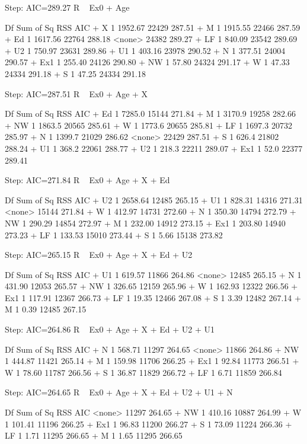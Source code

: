 \documentclass[a4paper]{article}
\begin{document}
\begin{itemize}
\begin{itemize}
\begin{itemize}
\begin{Schunk}
\begin{Soutput}
Step:  AIC=289.27
R ~ Ex0 + Age

       Df Sum of Sq   RSS    AIC
+ X     1   1952.67 22429 287.51
+ M     1   1915.55 22466 287.59
+ Ed    1   1617.56 22764 288.18
<none>              24382 289.27
+ LF    1    840.09 23542 289.69
+ U2    1    750.97 23631 289.86
+ U1    1    403.16 23978 290.52
+ N     1    377.51 24004 290.57
+ Ex1   1    255.40 24126 290.80
+ NW    1     57.80 24324 291.17
+ W     1     47.33 24334 291.18
+ S     1     47.25 24334 291.18

Step:  AIC=287.51
R ~ Ex0 + Age + X

       Df Sum of Sq   RSS    AIC
+ Ed    1    7285.0 15144 271.84
+ M     1    3170.9 19258 282.66
+ NW    1    1863.5 20565 285.61
+ W     1    1773.6 20655 285.81
+ LF    1    1697.3 20732 285.97
+ N     1    1399.7 21029 286.62
<none>              22429 287.51
+ S     1     626.4 21802 288.24
+ U1    1     368.2 22061 288.77
+ U2    1     218.3 22211 289.07
+ Ex1   1      52.0 22377 289.41

Step:  AIC=271.84
R ~ Ex0 + Age + X + Ed

       Df Sum of Sq   RSS    AIC
+ U2    1   2658.64 12485 265.15
+ U1    1    828.31 14316 271.31
<none>              15144 271.84
+ W     1    412.97 14731 272.60
+ N     1    350.30 14794 272.79
+ NW    1    290.29 14854 272.97
+ M     1    232.00 14912 273.15
+ Ex1   1    203.80 14940 273.23
+ LF    1    133.53 15010 273.44
+ S     1      5.66 15138 273.82

Step:  AIC=265.15
R ~ Ex0 + Age + X + Ed + U2

       Df Sum of Sq   RSS    AIC
+ U1    1    619.57 11866 264.86
<none>              12485 265.15
+ N     1    431.90 12053 265.57
+ NW    1    326.65 12159 265.96
+ W     1    162.93 12322 266.56
+ Ex1   1    117.91 12367 266.73
+ LF    1     19.35 12466 267.08
+ S     1      3.39 12482 267.14
+ M     1      0.39 12485 267.15

Step:  AIC=264.86
R ~ Ex0 + Age + X + Ed + U2 + U1

       Df Sum of Sq   RSS    AIC
+ N     1    568.71 11297 264.65
<none>              11866 264.86
+ NW    1    444.87 11421 265.14
+ M     1    159.98 11706 266.25
+ Ex1   1     92.84 11773 266.51
+ W     1     78.60 11787 266.56
+ S     1     36.87 11829 266.72
+ LF    1      6.71 11859 266.84

Step:  AIC=264.65
R ~ Ex0 + Age + X + Ed + U2 + U1 + N

       Df Sum of Sq   RSS    AIC
<none>              11297 264.65
+ NW    1    410.16 10887 264.99
+ W     1    101.41 11196 266.25
+ Ex1   1     96.83 11200 266.27
+ S     1     73.09 11224 266.36
+ LF    1      1.71 11295 266.65
+ M     1      1.65 11295 266.65


\end{Soutput}
\end{Schunk}
\end{itemize}
\end{itemize}
\end{itemize}
\end{document}
